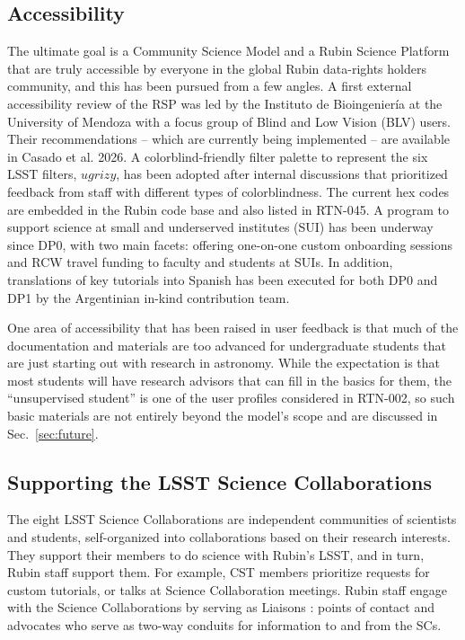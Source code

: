 \subsection{Accessibility}

The ultimate goal is a Community Science Model and a Rubin Science Platform that are truly accessible by everyone in the global Rubin data-rights holders community, and this has been pursued from a few angles.
A first external accessibility review of the RSP was led by the Instituto de Bioingenier\'{i}a at the University of Mendoza with a focus group of Blind and Low Vision (BLV) users.
Their recommendations -- which are currently being implemented -- are available in Casado et al. 2026\cite{casado_2026_18262310}.
A colorblind-friendly filter palette to represent the six LSST filters, $ugrizy$, has been adopted after internal discussions that prioritized feedback from staff with different types of colorblindness.
The current hex codes are embedded in the Rubin code base and also listed in RTN-045\cite{RTN-045}.
A program to support science at small and underserved institutes (SUI) has been underway since DP0, with two main facets: offering one-on-one custom onboarding sessions and RCW travel funding to faculty and students at SUIs.
In addition, translations of key tutorials into Spanish  has been executed for both DP0 and DP1 by the Argentinian in-kind contribution team.

One area of accessibility that has been raised in user feedback is that much of the documentation and materials are too advanced for undergraduate students that are just starting out with research in astronomy.
While the expectation is that most students will have research advisors that can fill in the basics for them, the ``unsupervised student'' is one of the user profiles considered in RTN-002\cite{RTN-002}, so such basic materials are not entirely beyond the model's scope and are discussed in Sec.~\ref{sec:future}.


\subsection{Supporting the LSST Science Collaborations}

The eight LSST Science Collaborations are independent communities of scientists and students, self-organized into collaborations based on their research interests.
They support their members to do science with Rubin's LSST, and in turn, Rubin staff support them.
For example, CST members prioritize requests for custom tutorials, or talks at Science Collaboration meetings.
Rubin staff engage with the Science Collaborations by serving as Liaisons \cite{RTN-118}: points of contact and advocates who serve as two-way conduits for information to and from the SCs.


